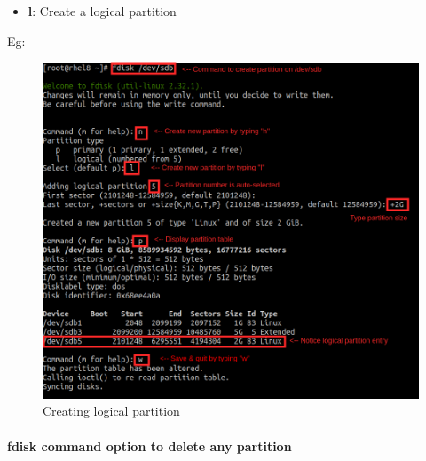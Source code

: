 \begin{flushleft}
\begin{itemize}
	\item \textbf{l}: Create a logical partition
\end{itemize}

Eg:
\begin{figure}[h!]
	\centering
	\includegraphics[scale=.4]{content/chapter8/images/logi.png}
	\caption{Creating logical partition}
	\label{primary_logi4}
\end{figure}		

\newpage

\paragraph{fdisk command option to delete any partition}


\end{flushleft}
